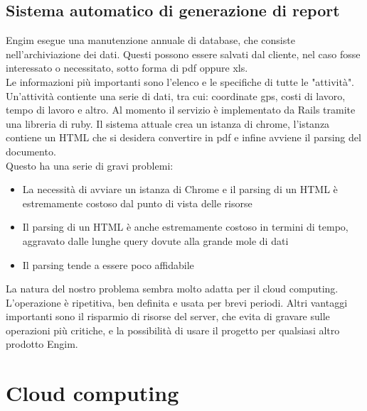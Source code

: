 \documentclass[12pt]{article}
\begin{document}
\subsection{Sistema automatico di generazione di report}
Engim esegue una manutenzione annuale di database, che consiste nell'archiviazione
dei dati. Questi possono essere salvati dal cliente, nel caso fosse interessato 
o necessitato, sotto forma di pdf oppure xls.
\\ 
Le informazioni più importanti sono l'elenco e le specifiche di tutte le "attività". 
Un'attività contiente una serie di dati, tra cui: coordinate
gps, costi di lavoro, tempo di lavoro e altro.  
Al momento il servizio è implementato da Rails tramite una libreria di ruby. 
Il sistema attuale crea un istanza di chrome, l'istanza contiene un HTML
che si desidera convertire in pdf e infine avviene il parsing del documento.
\\ Questo ha una serie di gravi problemi:
\begin{itemize}
  \item La necessità di avviare un istanza di Chrome e il parsing di un HTML è
  estremamente costoso dal punto di vista delle risorse
  \item Il parsing di un HTML è anche estremamente costoso in termini di tempo,
  aggravato dalle lunghe query dovute alla grande mole di dati 
  \item Il  parsing tende a essere poco affidabile
\end{itemize}
La natura del nostro problema sembra molto adatta per il cloud computing.
L'operazione è ripetitiva, ben definita e usata per brevi periodi. Altri vantaggi 
importanti sono il risparmio di risorse del server, che evita di gravare sulle 
operazioni più critiche, e la possibilità di usare il progetto per qualsiasi 
altro prodotto Engim.

\section{Cloud computing}
\end{document}

